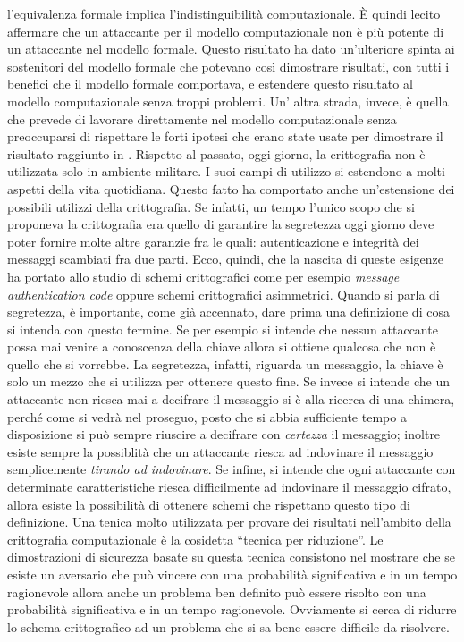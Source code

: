\documentclass[a4paper,openright,twoside,12pt]{report}
\begin{document}
l'equivalenza formale implica l'indistinguibilit\`a computazionale.
\`E quindi lecito affermare che un attaccante per il modello computazionale non \`e pi\`u potente di un attaccante nel modello formale. Questo risultato ha dato un'ulteriore spinta
ai sostenitori del modello formale che potevano cos\`i dimostrare risultati, con tutti i benefici che il modello formale comportava, 
e estendere questo risultato al modello computazionale senza troppi problemi.
Un' altra strada, invece, \`e quella che prevede di lavorare direttamente nel modello computazionale senza preoccuparsi di rispettare le forti ipotesi che erano 
state usate per dimostrare il risultato raggiunto in \cite{DBLP:journals/joc/AbadiR07}.
Rispetto al passato, oggi giorno, la crittografia non \`e utilizzata solo in ambiente militare. I suoi campi di utilizzo si estendono a molti aspetti della vita quotidiana.
Questo fatto ha comportato anche un'estensione dei possibili utilizzi della crittografia. Se infatti, un tempo l'unico scopo che si proponeva la crittografia era quello di garantire
la segretezza oggi giorno deve poter fornire molte altre garanzie fra le quali: autenticazione e integrit\`a dei messaggi scambiati fra due parti. Ecco, quindi, che la nascita di queste esigenze
ha portato allo studio di schemi crittografici come per esempio \emph{message authentication code} oppure schemi crittografici asimmetrici.
Quando si parla di segretezza, \`e importante, come gi\`a accennato, dare prima una definizione di cosa si intenda con questo termine.
Se per esempio si intende che nessun attaccante possa mai venire a conoscenza della chiave allora si ottiene qualcosa che non \`e quello che si vorrebbe. La segretezza, infatti, riguarda un messaggio, 
la chiave \`e solo un mezzo che si utilizza per ottenere questo fine. 
Se invece si intende che un attaccante non riesca mai a decifrare il messaggio si \`e alla ricerca di una chimera, perch\'e come si vedr\`a nel proseguo, posto che si abbia sufficiente tempo 
a disposizione si pu\`o sempre riuscire a decifrare con \emph{certezza} il messaggio; inoltre esiste sempre la possiblit\`a che un attaccante riesca ad indovinare il messaggio
semplicemente \emph{tirando ad indovinare}. Se infine, si intende che ogni attaccante con determinate caratteristiche riesca difficilmente ad indovinare il messaggio cifrato, allora esiste la 
possibilit\`a di ottenere schemi che rispettano questo tipo di definizione.
Una tenica molto utilizzata per provare dei risultati nell'ambito della crittografia computazionale \`e la cosidetta ``tecnica per riduzione''. 
Le dimostrazioni di sicurezza basate su questa tecnica consistono nel mostrare che se esiste un aversario che pu\`o vincere con una probabilit\`a significativa e in un
tempo ragionevole allora anche un problema ben definito pu\`o essere risolto con una probabilit\`a significativa e in un tempo ragionevole. Ovviamente si cerca di ridurre
lo schema crittografico ad un problema che si sa bene essere difficile da risolvere.
\end{document}
